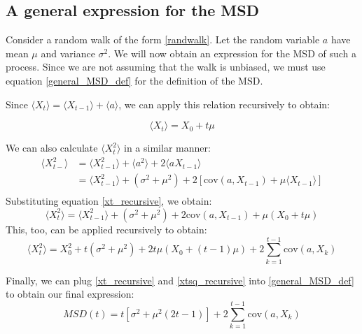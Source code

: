 \subsection{A general expression for the MSD}

Consider a random walk of the form \eqref{randwalk}. Let the random variable $a$ have mean $\mu$ and variance $\sigma^2$. We will now obtain an expression for the MSD of such a process. Since we are not assuming that the walk is unbiased, we must use equation \eqref{general_MSD_def} for the definition of the MSD.

Since $\big\langle X_{t}\big\rangle = \big\langle X_{t-1}\big\rangle + \big\langle a \big\rangle$, we can apply this relation recursively to obtain:

\begin{equation}
	\label{xt_recursive}
	\big\langle X_{t}\big\rangle = X_0 + t\mu
\end{equation}

We can also calculate $\big\langle X_{t}^2\big\rangle$ in a similar manner:
\begin{align*}
	\big\langle X_{t-}^2\big\rangle &= \big\langle X_{t-1}^2\big\rangle + \big\langle a^2 \big \rangle + 2\big\langle aX_{t-1}\big\rangle \\
	&= \big\langle X_{t-1}^2\big\rangle + (\sigma^2 + \mu^2) + 2\left[\textrm{cov}(a,X_{t-1})+\mu\big\langle X_{t-1}\big\rangle\right]\\
\end{align*}
Substituting equation \eqref{xt_recursive}, we obtain:
\begin{equation*}
	\big\langle X_{t}^2\big\rangle = \big\langle X_{t-1}^2\big\rangle + (\sigma^2 + \mu^2) + 2\textrm{cov}(a,X_{t-1})+\mu(X_0 + t\mu) 
\end{equation*}
This, too, can be applied recursively to obtain:
\begin{equation}
	\label{xtsq_recursive}
	\big\langle X_{t}^2\big\rangle = X_{0}^2 + t(\sigma^2 + \mu^2) + 2t\mu(X_0 + (t-1)\mu) + 2\sum\limits_{k=1}^{t-1}\textrm{cov}(a,X_k)
\end{equation}

Finally, we can plug \eqref{xt_recursive} and \eqref{xtsq_recursive} into \eqref{general_MSD_def} to obtain our final expression:
\begin{equation}
	\label{general_MSD}
	MSD(t) = t\left[\sigma^2+\mu^{2}(2t-1)\right]+2\sum\limits_{k=1}^{t-1}\textrm{cov}(a,X_k)
\end{equation}

